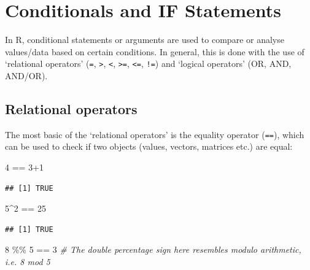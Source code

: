 \documentclass[
]{book}
\newenvironment{Shaded}{\begin{snugshade}}{\end{snugshade}}
\newcommand{\CommentTok}[1]{\textcolor[rgb]{0.56,0.35,0.01}{\textit{#1}}}
\newcommand{\DecValTok}[1]{\textcolor[rgb]{0.00,0.00,0.81}{#1}}
\newcommand{\SpecialCharTok}[1]{\textcolor[rgb]{0.00,0.00,0.00}{#1}}
\theoremstyle{definition}
\theoremstyle{definition}
\theoremstyle{definition}
\theoremstyle{definition}
\theoremstyle{remark}
\begin{document}
\hypertarget{conditionals-and-if-statements}{%
\chapter{Conditionals and IF Statements}\label{conditionals-and-if-statements}}

In R, conditional statements or arguments are used to compare or analyse values/data based on certain conditions. In general, this is done with the use of `relational operators' (\texttt{=}, \texttt{\textgreater{}}, \texttt{\textless{}}, \texttt{\textgreater{}=}, \texttt{\textless{}=}, \texttt{!=}) and `logical operators' (OR, AND, AND/OR).

\hypertarget{relational-operators}{%
\section{Relational operators}\label{relational-operators}}

The most basic of the `relational operators' is the equality operator (\texttt{==}), which can be used to check if two objects (values, vectors, matrices etc.) are equal:

\begin{Shaded}
\begin{Highlighting}[]
\DecValTok{4} \SpecialCharTok{==} \DecValTok{3}\SpecialCharTok{+}\DecValTok{1}
\end{Highlighting}
\end{Shaded}

\begin{verbatim}
## [1] TRUE
\end{verbatim}

\begin{Shaded}
\begin{Highlighting}[]
\DecValTok{5}\SpecialCharTok{\^{}}\DecValTok{2} \SpecialCharTok{==} \DecValTok{25}
\end{Highlighting}
\end{Shaded}

\begin{verbatim}
## [1] TRUE
\end{verbatim}

\begin{Shaded}
\begin{Highlighting}[]
\DecValTok{8} \SpecialCharTok{\%\%} \DecValTok{5} \SpecialCharTok{==} \DecValTok{3}  \CommentTok{\# The double percentage sign here resembles modulo arithmetic, i.e. 8 mod 5}
\end{Highlighting}
\end{Shaded}
\end{document}
